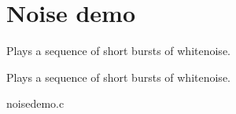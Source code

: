 \section{Noise demo}
\label{group__noisedemo}


Plays a sequence of short bursts of whitenoise.  


Plays a sequence of short bursts of whitenoise. 
\begin{DoxyCodeInclude}
\end{DoxyCodeInclude}
 noisedemo.c 